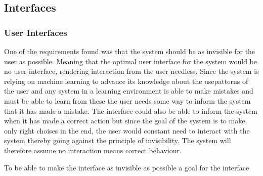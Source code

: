 \subsection{Interfaces}
\subsubsection{User Interfaces}
One of the requirements found was that the system should be as invisible for the user as possible. Meaning that the optimal user interface for the system would be no user interface, rendering  interaction from the user needless. Since the system is relying on machine learning to advance its knowledge about the usepatterns of the user and any system in a learning environment is able to make mistakes and must be able to learn from these the user needs some way to inform the system that it has made a mistake. The interface could also be able to inform the system when it has made a correct action but since the goal of the system is to make only right choises in the end, the user would constant need to interact with the system thereby going against the principle of invisibility. The system will therefore assume no interaction means correct behaviour.

To be able to make the interface as invisible as possible a goal for the interface
